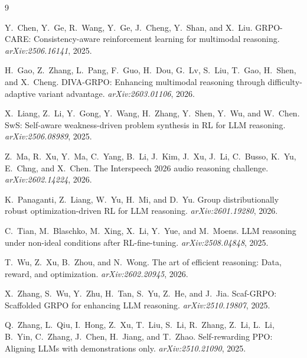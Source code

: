\documentclass[11pt]{article}
\begin{document}

\begin{thebibliography}{9}

Y.~Chen, Y.~Ge, R.~Wang, Y.~Ge, J.~Cheng, Y.~Shan, and X.~Liu.
\newblock GRPO-CARE: Consistency-aware reinforcement learning for multimodal reasoning.
\newblock \emph{arXiv:2506.16141}, 2025.

H.~Gao, Z.~Zhang, L.~Pang, F.~Guo, H.~Dou, G.~Lv, S.~Liu, T.~Gao, H.~Shen, and X.~Cheng.
\newblock DIVA-GRPO: Enhancing multimodal reasoning through difficulty-adaptive variant advantage.
\newblock \emph{arXiv:2603.01106}, 2026.

X.~Liang, Z.~Li, Y.~Gong, Y.~Wang, H.~Zhang, Y.~Shen, Y.~Wu, and W.~Chen.
\newblock SwS: Self-aware weakness-driven problem synthesis in RL for LLM reasoning.
\newblock \emph{arXiv:2506.08989}, 2025.

Z.~Ma, R.~Xu, Y.~Ma, C.~Yang, B.~Li, J.~Kim, J.~Xu, J.~Li, C.~Busso, K.~Yu, E.~Chng, and X.~Chen.
\newblock The Interspeech 2026 audio reasoning challenge.
\newblock \emph{arXiv:2602.14224}, 2026.

K.~Panaganti, Z.~Liang, W.~Yu, H.~Mi, and D.~Yu.
\newblock Group distributionally robust optimization-driven RL for LLM reasoning.
\newblock \emph{arXiv:2601.19280}, 2026.

C.~Tian, M.~Blaschko, M.~Xing, X.~Li, Y.~Yue, and M.~Moens.
\newblock LLM reasoning under non-ideal conditions after RL-fine-tuning.
\newblock \emph{arXiv:2508.04848}, 2025.

T.~Wu, Z.~Xu, B.~Zhou, and N.~Wong.
\newblock The art of efficient reasoning: Data, reward, and optimization.
\newblock \emph{arXiv:2602.20945}, 2026.

X.~Zhang, S.~Wu, Y.~Zhu, H.~Tan, S.~Yu, Z.~He, and J.~Jia.
\newblock Scaf-GRPO: Scaffolded GRPO for enhancing LLM reasoning.
\newblock \emph{arXiv:2510.19807}, 2025.

Q.~Zhang, L.~Qiu, I.~Hong, Z.~Xu, T.~Liu, S.~Li, R.~Zhang, Z.~Li, L.~Li, B.~Yin, C.~Zhang, J.~Chen, H.~Jiang, and T.~Zhao.
\newblock Self-rewarding PPO: Aligning LLMs with demonstrations only.
\newblock \emph{arXiv:2510.21090}, 2025.

\end{thebibliography}
\end{document}
